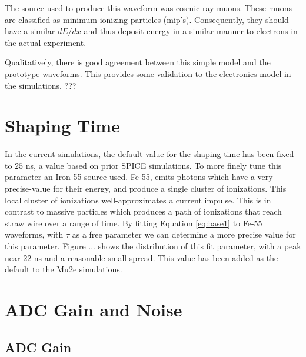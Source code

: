 The source used to produce this waveform was
cosmic-ray muons. These muons are classified as minimum ionizing particles (mip's). Consequently, they should have a similar $dE/dx$ and thus deposit energy in a similar manner to electrons in the actual experiment.

Qualitatively, there is good agreement between this simple model and the prototype waveforms. This provides some validation to the electronics model in the simulations. ???

\section{Shaping Time}
In the current simulations, the default value for the shaping time has been fixed to $25$ ns, a value based on prior SPICE simulations. To more finely tune this parameter an Iron-55 source used. Fe-55, emits photons which have a very precise-value for their energy, and produce a single cluster of ionizations. This local cluster of ionizations well-approximates a current impulse. This is in contrast to massive particles which produces a path of ionizations that reach straw wire over a range of time. By fitting Equation \ref{eq:base1} to Fe-55 waveforms, with $\tau$ as a free parameter we can determine a more precise value for this parameter. Figure ... shows the distribution of this fit parameter, with a peak near $22$ ns and a reasonable small spread. This value has been added as the default to the Mu2e simulations.

\section{ADC Gain and Noise}

\subsection{ADC Gain}

